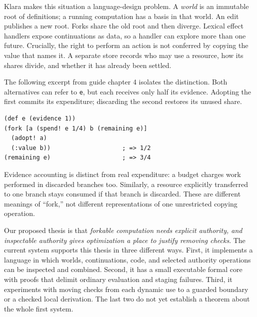 \documentclass[acmsmall,screen,review,nonacm]{acmart}
\newcommand{\src}[1]{{\normalfont\nolinkurl{#1}}}
\begin{document}
Klara makes this situation a language-design problem. A \emph{world} is an
immutable root of definitions; a running computation has a basis in that world.
An edit publishes a new root. Forks share the old root and then diverge.
Lexical effect handlers expose continuations as data, so a handler can explore
more than one future. Crucially, the right to perform an action is not conferred
by copying the value that names it. A separate store records who may use a
resource, how its shares divide, and whether it has already been settled.

The following excerpt from guide chapter 4 isolates the distinction. Both
alternatives can refer to \src{e}, but each receives only half its evidence.
Adopting the first commits its expenditure; discarding the second restores its
unused share.
\begin{lstlisting}
(def e (evidence 1))
(fork [a (spend! e 1/4) b (remaining e)]
  (adopt! a)
  (:value b))                    ; => 1/2
(remaining e)                    ; => 3/4
\end{lstlisting}
Evidence accounting is distinct from real expenditure: a budget charges work
performed in discarded branches too. Similarly, a resource explicitly
transferred to one branch stays consumed if that branch is discarded. These
are different meanings of ``fork,'' not different representations of one
unrestricted copying operation.

Our proposed thesis is that \emph{forkable computation needs explicit authority,
and inspectable authority gives optimization a place to justify removing
checks}. The current system supports this thesis in three different ways.
First, it implements a language in which worlds, continuations, code, and
selected authority operations can be inspected and combined. Second, it has a
small executable formal core with proofs that delimit ordinary evaluation and
staging failures. Third, it experiments with moving checks from each dynamic
use to a guarded boundary or a checked local derivation. The last two do not
yet establish a theorem about the whole first system.
\end{document}
